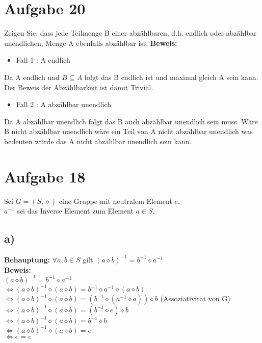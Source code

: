 \documentclass[paper = a4, ngerman]{scrartcl}
\begin{document}
	\section*{Aufgabe 20}
	Zeigen Sie, dass jede Teilmenge B einer abzählbaren, d.h. endlich oder abzählbar unendlichen, Menge A ebenfalls abzählbar ist.
	\textbf{Beweis:}
	\begin{itemize}
		\item Fall 1 : A endlich
	\end{itemize}
		Da A endlich und $B \subseteq A$  folgt das B endlich ist und maximal gleich A sein kann. Der Beweis der Abzählbarkeit ist damit Trivial.
	\begin{itemize}
		\item Fall 2 : A abzählbar unendlich
	\end{itemize}
		Da A abzählbar unendlich folgt das B auch abzählbar unendlich sein muss. Wäre B nicht abzählbar unendlich wäre ein Teil von A nicht abzählbar unendlich was bedeuten würde das A nicht abzählbar unendlich sein kann.

	
	
	\section*{Aufgabe 18}
	
	Sei $G = (S,\diamond)$ eine Gruppe mit neutralem Element $e$.\\
	$a^{-1}$ sei das Inverse Element zum Element $a \in S$.\\
	
	\subsection*{a)}
	\textbf{Behauptung:} $\forall a,b \in S$ gilt $ (a \diamond b)^{-1} = b^{-1} \diamond a^{-1}$\\
	
	\textbf{Beweis:}\\
	$ (a \diamond b)^{-1} = b^{-1} \diamond a^{-1}$\\
	$\Leftrightarrow (a \diamond b)^{-1} \diamond (a \diamond b)= b^{-1} \diamond a^{-1} \diamond(a \diamond b)$\\
	$\Leftrightarrow (a \diamond b)^{-1} \diamond (a \diamond b)= (b^{-1} \diamond (a^{-1} \diamond a)) \diamond b$ \hspace{10mm} (Assoziativität von G)\\
	$\Leftrightarrow (a \diamond b)^{-1} \diamond (a \diamond b)= (b^{-1} \diamond e) \diamond b$\\
	$\Leftrightarrow (a \diamond b)^{-1} \diamond (a \diamond b)= b^{-1} \diamond b$\\
	$\Leftrightarrow (a \diamond b)^{-1} \diamond (a \diamond b)= e$\\
	$\Leftrightarrow e= e$\\
	
\end{document}
